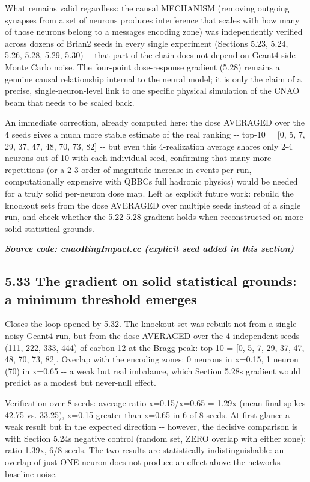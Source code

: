 \documentclass[
  english,
]{article}
\begin{document}
What remains valid regardless: the causal MECHANISM (removing outgoing synapses from a set of neurons produces interference that scales with how many of those neurons belong to a message\textquotesingle s encoding zone) was independently verified across dozens of Brian2 seeds in every single experiment (Sections 5.23, 5.24, 5.26, 5.28, 5.29, 5.30) -\/- that part of the chain does not depend on Geant4-side Monte Carlo noise. The four-point dose-response gradient (5.28) remains a genuine causal relationship internal to the neural model; it is only the claim of a precise, single-neuron-level link to one specific physical simulation of the CNAO beam that needs to be scaled back.

An immediate correction, already computed here: the dose AVERAGED over the 4 seeds gives a much more stable estimate of the real ranking -\/- top-10 = {[}0, 5, 7, 29, 37, 47, 48, 70, 73, 82{]} -\/- but even this 4-realization average shares only 2-4 neurons out of 10 with each individual seed, confirming that many more repetitions (or a 2-3 order-of-magnitude increase in events per run, computationally expensive with QBBC\textquotesingle s full hadronic physics) would be needed for a truly solid per-neuron dose map. Left as explicit future work: rebuild the knockout sets from the dose AVERAGED over multiple seeds instead of a single run, and check whether the 5.22-5.28 gradient holds when reconstructed on more solid statistical grounds.

\textit{\textbf{Source code: cnaoRingImpact.cc (explicit seed added in this section)}}


\subsection{5.33 The gradient on solid statistical grounds: a minimum threshold emerges}\label{the-gradient-on-solid-statistical-grounds-a-minimum-threshold-emerges}

Closes the loop opened by 5.32. The knockout set was rebuilt not from a single noisy Geant4 run, but from the dose AVERAGED over the 4 independent seeds (111, 222, 333, 444) of carbon-12 at the Bragg peak: top-10 = {[}0, 5, 7, 29, 37, 47, 48, 70, 73, 82{]}. Overlap with the encoding zones: 0 neurons in x=0.15, 1 neuron (70) in x=0.65 -\/- a weak but real imbalance, which Section 5.28\textquotesingle s gradient would predict as a modest but never-null effect.

Verification over 8 seeds: average ratio x=0.15/x=0.65 = 1.29x (mean final spikes 42.75 vs. 33.25), x=0.15 greater than x=0.65 in 6 of 8 seeds. At first glance a weak result but in the expected direction -\/- however, the decisive comparison is with Section 5.24\textquotesingle s negative control (random set, ZERO overlap with either zone): ratio 1.39x, 6/8 seeds. The two results are statistically indistinguishable: an overlap of just ONE neuron does not produce an effect above the network\textquotesingle s baseline noise.
\end{document}
